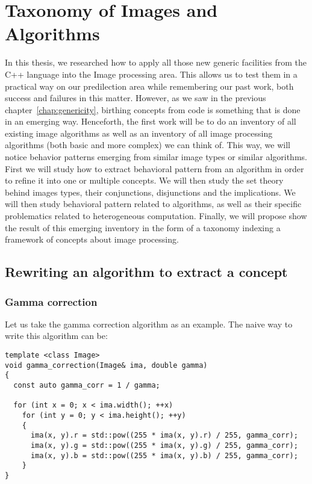 \chapter{Taxonomy of Images and Algorithms}
\label{chap:image.algorithms.taxonomy}

In this thesis, we researched how to apply all those new generic facilities from the C++ language into the Image
processing area. This allows us to test them in a practical way on our predilection area while remembering our past
work, both success and failures in this matter. However, as we saw in the previous chapter~\ref{chap:genericity},
birthing concepts from code is something that is done in an emerging way. Henceforth, the first work will be to do an
inventory of all existing image algorithms as well as an inventory of all image processing algorithms (both basic and
more complex) we can think of. This way, we will notice behavior patterns emerging from similar image types or similar
algorithms. First we will study how to extract behavioral pattern from an algorithm in order to refine it into one or
multiple concepts. We will then study the set theory behind images types, their conjunctions, disjunctions and the
implications. We will then study behavioral pattern related to algorithms, as well as their specific problematics
related to heterogeneous computation. Finally, we will propose show the result of this emerging inventory in the form of
a taxonomy indexing a framework of concepts about image processing.

\section{Rewriting an algorithm to extract a concept}
\label{sec:rewriting}

\subsection{Gamma correction}
\label{subsec:gamma}

Let us take the gamma correction algorithm as an example. The naive way to write this algorithm can be:

\begin{verbatim}
template <class Image>
void gamma_correction(Image& ima, double gamma)
{
  const auto gamma_corr = 1 / gamma;

  for (int x = 0; x < ima.width(); ++x)
    for (int y = 0; y < ima.height(); ++y)
    {
      ima(x, y).r = std::pow((255 * ima(x, y).r) / 255, gamma_corr);
      ima(x, y).g = std::pow((255 * ima(x, y).g) / 255, gamma_corr);
      ima(x, y).b = std::pow((255 * ima(x, y).b) / 255, gamma_corr);
    }
}
\end{verbatim}

